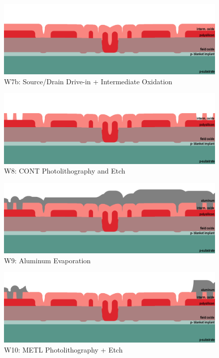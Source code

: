 \documentclass{article}
\begin{document}
\begin{figure}[H]
\centering
\includegraphics[width=350pt]{CrossSections/MEMSlabprofiles/MEMSw7b.png}
\caption{W7b: Source/Drain Drive-in + Intermediate Oxidation}
\end{figure}
\begin{figure}[H]
\centering
\includegraphics[width=350pt]{CrossSections/MEMSlabprofiles/MEMSw8.png}
\caption{W8: CONT Photolithography and Etch}
\end{figure}
\begin{figure}[H]
\centering
\includegraphics[width=350pt]{CrossSections/MEMSlabprofiles/MEMSw9.png}
\caption{W9: Aluminum Evaporation}
\end{figure}
\begin{figure}[H]
\centering
\includegraphics[width=350pt]{CrossSections/MEMSlabprofiles/MEMSw10.png}
\caption{W10: METL Photolithography + Etch}
\end{figure}
\end{document}
